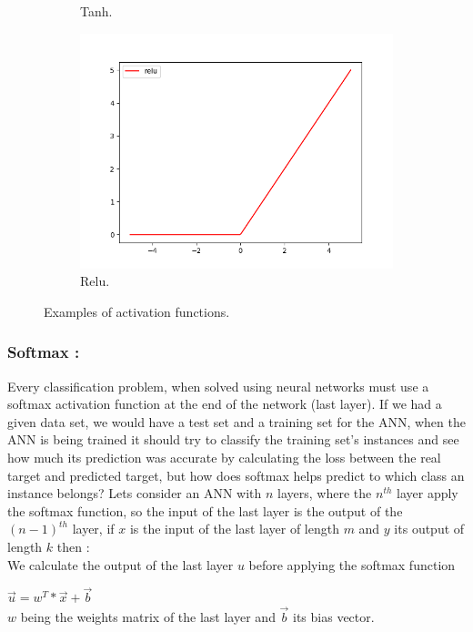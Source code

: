 \documentclass[10pt,a4paper]{article}
\begin{document}
\begin{figure}[H]
\begin{subfigure}[b]{0.3\textwidth}
\caption{Tanh.}
\end{subfigure}
\begin{subfigure}[b]{0.3\textwidth}
\includegraphics[scale=0.3]{relu.png}
\caption{Relu.}
\end{subfigure}
\caption{Examples of activation functions.}
\end{figure}
\subsubsection{Softmax :}
Every classification problem, when solved using neural networks must use a softmax activation function at the end of the network (last layer). If we had a given data set, we would have a test set and a training set for the ANN, when the ANN is being trained it should try to classify the training set's instances and see how much its prediction was accurate by calculating the loss between the real target and predicted target, but how does softmax helps predict to which class an instance belongs? Lets consider an ANN with $ n $ layers, where the $ n^{th} $ layer apply the softmax function, so the input of the last layer is the output of the $ (n-1)^{th} $ layer, if $ x $ is the input of the last layer of length $ m $ and $ y $ its output of length $ k $ then :\\
We calculate the output of the last layer $ u $ before applying the softmax function
\begin{center}
$ \vec{u} = w^{T}*\vec{x} + \vec{b} $\\
$ w $ being the weights matrix of the last layer and $ \vec{b} $ its bias vector.
\end{center}
\end{document}
